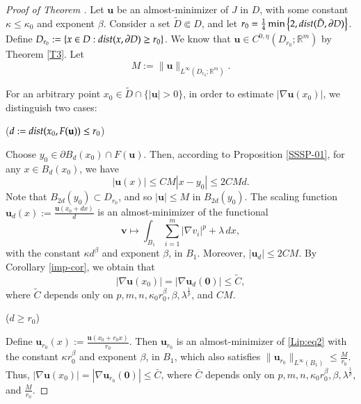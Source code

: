 \documentclass{amsart}
\newcommand{\dist}{{\rm dist}}
\begin{document}
\begin{proof}[Proof of Theorem \normalfont{\ref{T1}}]
Let $\mathbf{u}$ be an almost-minimizer of $J$ in $D$, with some constant $\kappa\le \kappa_0$ and exponent $\beta$. Consider a set $\tilde{D} \Subset D$, and let $r_0= \frac 14 \min \left\{2,  \dist(\tilde{D}, \partial D) \right\}$.
Define $D_{r_0}:=\{x \in D: \dist(x,\partial D)\ge r_0\}$. We know that $\mathbf{u}\in C^{0,\eta}(D_{r_0}; \mathbb{R}^m)$ by Theorem \ref{T3}.
Let 
$$M:= \|\mathbf{u}\|_{L^\infty(D_{r_0}; \mathbb{R}^m)}.$$

For an arbitrary point $x_0\in \tilde{D} \cap \{|\mathbf{u}| > 0\}$, in order to estimate $|\nabla \mathbf{u}(x_0)|$, we distinguish two cases:


\medskip

 {($d:=\dist(x_0, F(\mathbf{u}))\le r_0$)}
\medskip

\noindent
Choose $y_0\in \partial B_d(x_0)\cap F(\mathbf{u})$. Then, according to Proposition \ref{SSSP-01}, for any $x\in B_{d}(x_0)$, we have
$$ |\mathbf{u}(x)| \le CM|x-y_0| \le 2CMd. $$
Note that $B_{2d}(y_0) \subset D_{r_0}$, and so $|\mathbf{u}| \le M$ in $B_{2d}(y_0)$.
The scaling function $\mathbf{u}_d(x):=\frac{\mathbf{u}(x_0+dx)}{d}$ is an almost-minimizer of the functional
\begin{equation}\label{Lip:eq2}
 \mathbf{v} \mapsto \int_{B_1} \sum_{i=1}^{m} |\nabla v_i|^p + \lambda \, dx, 
 \end{equation}
with the constant $\kappa d^{\beta}$ and exponent $\beta$, in $B_1$. Moreover, $|\mathbf{u}_d|\le 2CM$.
By Corollary \ref{imp-cor}, we obtain that
$$
|\nabla \mathbf{u}(x_0)|=|\nabla \mathbf{u}_d(\mathbf{0})| \le \tilde C,
$$
where $\tilde C$ depends only on $p, m, n, \kappa_0r_0^{\beta}, \beta, \lambda^{\frac{1}{p}}$, and $CM$.


\medskip

 {($d \ge r_0$)}
\medskip

\noindent
Define $\mathbf{u}_{r_0}(x):=\frac{\mathbf{u}(x_0+r_0x)}{r_0}$. Then 
 $\mathbf{u}_{r_0}$ is an almost-minimizer of \eqref{Lip:eq2} with the constant $\kappa r_0^{\beta}$ and exponent $\beta$, in $B_1$, which also satisfies $ \|\mathbf{u}_{r_0}\|_{L^\infty(B_1)} \le \frac{M}{r_0}$.
Thus, $|\nabla \mathbf{u}(x_0)|=|\nabla \mathbf{u}_{r_0}(\mathbf{0})| \le \bar C$, where $\bar C$ depends only on $p, m, n, \kappa_0 r_0^{\beta}, \beta, \lambda^{\frac{1}{p}}$, and $\frac{M}{r_0}$.
\end{proof}
\end{document}
